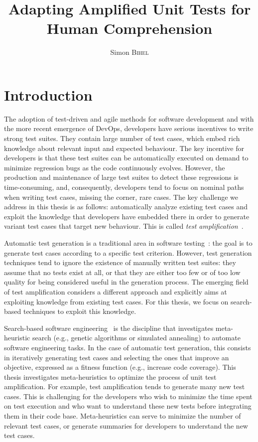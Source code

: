 \documentclass[a4paper,11pt]{sdm_internship}
\title{Adapting Amplified Unit Tests for Human Comprehension}
\author{Simon \textsc{Bihel}}
\theoremstyle{definition}
\begin{document}
\maketitle

\section*{Introduction}%
\label{sec:intro}%
The adoption of test-driven and agile methods for software development and with the more recent emergence of DevOps, developers have serious incentives to write strong test suites.
They contain large number of test cases, which embed rich knowledge about relevant input and expected behaviour.
The key incentive for developers is that these test suites can be automatically executed on demand to minimize regression bugs as the code continuously evolves.
However, the production and maintenance of large test suites to detect these regressions is time-consuming, and, consequently, developers tend to focus on nominal paths when writing test cases, missing the corner, rare cases.
The key challenge we address in this thesis is as follows: automatically analyze existing test cases and exploit the knowledge that developers have embedded there in order to generate variant test cases that target new behaviour.
This is called \emph{test amplification}~\cite{danglot2017emerging}.

Automatic test generation is a traditional area in software testing~\cite{mcminn2011search}: the goal is to generate test cases according to a specific test criterion.
However, test generation techniques tend to ignore the existence of manually written test suites: they assume that no tests exist at all, or that they are either too few or of too low quality for being considered useful in the generation process.
The emerging field of test amplification considers a different approach and explicitly aims at exploiting knowledge from existing test cases.
For this thesis, we focus on search-based techniques to exploit this knowledge.

Search-based software engineering~\cite{harman2001search} is the discipline that investigates meta-heuristic search (e.g., genetic algorithms or simulated annealing) to automate software engineering tasks.
In the case of automatic test generation, this consists in iteratively generating test cases and selecting the ones that improve an objective, expressed as a fitness function (e.g., increase code coverage).
This thesis investigates meta-heuristics to optimize the process of unit test amplification.
For example, test amplification tends to generate many new test cases.
This is challenging for the developers who wish to minimize the time spent on test execution and who want to understand these new tests before integrating them in their code base.
Meta-heuristics can serve to minimize the number of relevant test cases, or generate summaries for developers to understand the new test cases.
\end{document}
